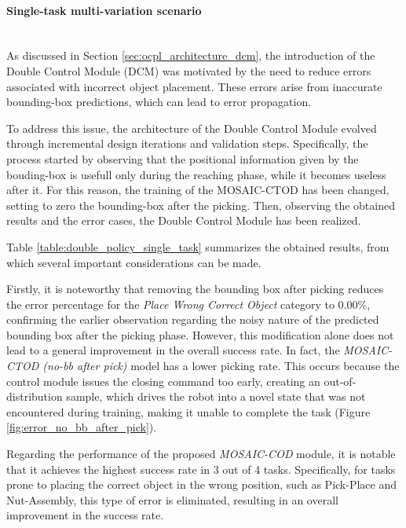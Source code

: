 \paragraph*{Single-task multi-variation scenario}\mbox{}\\
As discussed in Section \ref{sec:ocpl_architecture_dcm}, the introduction of the Double Control Module (DCM) was motivated by the need to reduce errors associated with incorrect object placement. These errors arise from inaccurate bounding-box predictions, which can lead to error propagation. 

To address this issue, the architecture of the Double Control Module evolved through incremental design iterations and validation steps.
Specifically, the process started by observing that the positional information given by the bouding-box is usefull only during the reaching phase, while it becomes useless after it. For this reason, the training of the MOSAIC-CTOD has been changed, setting to zero the bounding-box after the picking. Then, observing the obtained results and the error cases, the Double Control Module has been realized.


Table \ref{table:double_policy_single_task} summarizes the obtained results, from which several important considerations can be made.

Firstly, it is noteworthy that removing the bounding box after picking reduces the error percentage for the \textit{Place Wrong Correct Object} category to 0.00\%, confirming the earlier observation regarding the noisy nature of the predicted bounding box after the picking phase. However, this modification alone does not lead to a general improvement in the overall success rate. In fact, the \textit{MOSAIC-CTOD (no-bb after pick)} model has a lower picking rate. This occurs because the control module issues the closing command too early, creating an out-of-distribution sample, which drives the robot into a novel state that was not encountered during training, making it unable to complete the task (Figure \ref{fig:error_no_bb_after_pick}).



Regarding the performance of the proposed \textit{MOSAIC-COD} module, it is notable that it achieves the highest success rate in 3 out of 4 tasks. Specifically, for tasks prone to placing the correct object in the wrong position, such as Pick-Place and Nut-Assembly, this type of error is eliminated, resulting in an overall improvement in the success rate.

